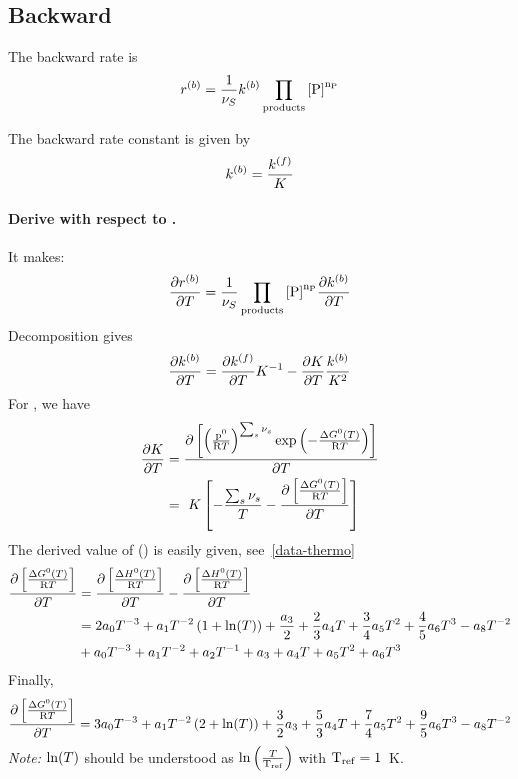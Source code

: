 \subsection{Backward}

The backward rate is
\begin{equation}
\bkwdrate = \frac{1}{\scoef[S]}\bkwdratecons\prodProd
\end{equation}

The backward rate constant is given by
\begin{equation}
\bkwdratecons = \frac{\fwdratecons}{\Eqconst}
\end{equation}

\paragraph{Derive with respect to \Temp.}
It makes:
\begin{equation}
\doverdT{\bkwdrate} = \frac{1}{\scoef[S]}\prodProd\doverdT{\bkwdratecons}
\end{equation}
Decomposition gives
\begin{equation}
\doverdT{\bkwdratecons} = \doverdT{\fwdratecons}\Eqconst^{-1} - \doverdT{\Eqconst}\frac{\bkwdratecons}{\Eqconst^{2}}
\label{rateb-decomp}
\end{equation}
For \Eqconst, we have
\begin{equation}
\begin{split}
\doverdT{\Eqconst} & = \doverdT{\left[\left(\frac{\pz}{\Rg \Temp}\right)^{\sum_s \scoef[s]} \exp\left(-\frac{\DGibbsZ(\Temp)}{\Rg \Temp}\right)\right]} \\
                   & = \Eqconst\left[-\frac{\sum_s\scoef[s]}{\Temp} - \doverdT{\left[\frac{\DGibbsZ(\Temp)}{\Rg \Temp}\right]}\right]
\end{split}
\end{equation}
The derived value of \DGibbsZ(\Temp) is easily given, see~\ref{data-thermo}
\begin{equation}
\begin{split}
\doverdT{\left[\frac{\DGibbsZ(\Temp)}{\Rg \Temp}\right]} 
        &= \doverdT{\left[\frac{\DenthZ(T)}{\Rg \Temp}\right]} - \doverdT{\left[\frac{\DenthZ(\Temp)}{\Rg \Temp}\right]} \\
        &= 2\tc{0}\Temp^{-3} + \tc{1}\Temp^{-2}\left(1+\ln(\Temp)\right) + \frac{\tc{3}}{2} + 
           \frac{2}{3}\tc{4}\Temp + \frac{3}{4}\tc{5}\Temp^{2} + \frac{4}{5}\tc{6}\Temp^3 - \tc{8}\Temp^{-2}\\
        &+ \tc{0}\Temp^{-3} + \tc{1}\Temp^{-2} + \tc{2}\Temp^{-1} + \tc{3} + \tc{4}\Temp + \tc{5} \Temp^{2} + \tc{6} \Temp^{3}
\end{split}
\end{equation}
Finally,
\begin{equation}
\doverdT{\left[\frac{\DGibbsZ(\Temp)}{\Rg \Temp}\right]} =
        3\tc{0}\Temp^{-3} + \tc{1} \Temp^{-2} \left(2 + \ln(\Temp)\right) + \frac{3}{2} \tc{3} + \frac{5}{3} \tc{4} \Temp
        + \frac{7}{4}\tc{5} \Temp^2 + \frac{9}{5}\tc{6} \Temp^3 - \tc{8} \Temp^{-2}
\end{equation}
\emph{Note:} $\ln(\Temp)$ should be understood as $\ln\left(\frac{\Temp}{\mathrm{\Temp_{ref}}}\right)$ with 
$\mathrm{\Temp_{ref}} = 1$~K.

